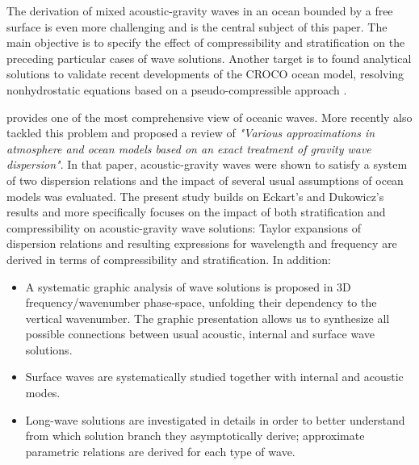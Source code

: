 \documentclass[a4paper,11pt]{article}
\begin{document}
The derivation of mixed acoustic-gravity waves in an ocean bounded by a free surface is even more challenging and is the central subject of this paper. The main objective is to specify the effect of compressibility and stratification on the preceding particular cases of wave solutions. Another target is to found analytical solutions to validate recent developments of the CROCO ocean model, resolving nonhydrostatic equations based on a pseudo-compressible approach \citep{AUCLAIR201812}.

\cite{ECKART1960136} provides one of the most comprehensive view of oceanic waves.
More recently \cite{dukowicz_2013} also tackled this problem and proposed a review of \textit{"Various approximations in atmosphere and ocean models based on an exact treatment of gravity wave dispersion"}. In that paper, acoustic-gravity waves were shown to satisfy a system of two dispersion relations and the impact of several usual assumptions of ocean models was evaluated. The present study builds on Eckart's and Dukowicz's results and more specifically focuses on the impact of both stratification and compressibility on acoustic-gravity wave solutions: Taylor expansions of dispersion relations and resulting expressions for wavelength and frequency are derived in terms of compressibility and stratification. In addition:
\begin{itemize}
	\item A systematic graphic analysis of wave solutions is proposed in 3D frequency/wavenumber phase-space, unfolding their dependency to the vertical wavenumber. The graphic presentation allows us to synthesize all possible connections between usual acoustic, internal and surface wave solutions.
	\item Surface waves are systematically studied together with internal and acoustic modes.
	\item Long-wave solutions are investigated in details in order to better understand from which solution branch they asymptotically derive; approximate parametric relations are derived for each type of wave.
\end{itemize}
\end{document}
